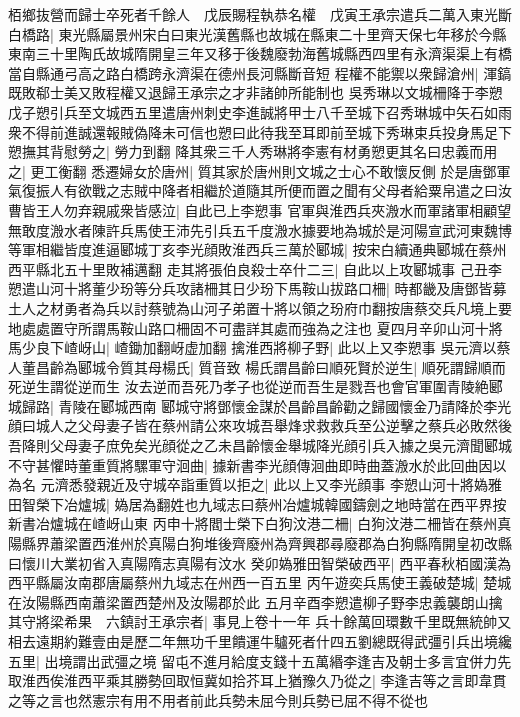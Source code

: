 栢鄉抜營而歸士卒死者千餘人　戊辰賜程執恭名權　戊寅王承宗遣兵二萬入東光斷白橋路|{
	東光縣屬景州宋白曰東光漢舊縣也故城在縣東二十里齊天保七年移於今縣東南三十里陶氏故城隋開皇三年又移于後魏廢勃海舊城縣西四里有永濟渠渠上有橋當自縣通弓高之路白橋跨永濟渠在德州長河縣斷音短}
程權不能禦以衆歸滄州|{
	渾鎬既敗郗士美又敗程權又退歸王承宗之才非諸帥所能制也}
吳秀琳以文城柵降于李愬戊子愬引兵至文城西五里遣唐州刺史李進誠將甲士八千至城下召秀琳城中矢石如雨衆不得前進誠還報賊偽降未可信也愬曰此待我至耳即前至城下秀琳束兵投身馬足下愬撫其背慰勞之|{
	勞力到翻}
降其衆三千人秀琳將李憲有材勇愬更其名曰忠義而用之|{
	更工衡翻}
悉遷婦女於唐州|{
	質其家於唐州則文城之士心不敢懷反側}
於是唐鄧軍氣復振人有欲戰之志賊中降者相繼於道隨其所便而置之聞有父母者給粟帛遣之曰汝曹皆王人勿弃親戚衆皆感泣|{
	自此已上李愬事}
官軍與淮西兵夾溵水而軍諸軍相顧望無敢度溵水者陳許兵馬使王沛先引兵五千度溵水據要地為城於是河陽宣武河東魏博等軍相繼皆度進逼郾城丁亥李光顔敗淮西兵三萬於郾城|{
	按宋白續通典郾城在蔡州西平縣北五十里敗補邁翻}
走其將張伯良殺士卒什二三|{
	自此以上攻郾城事}
己丑李愬遣山河十將董少玢等分兵攻諸柵其日少玢下馬鞍山拔路口柵|{
	時都畿及唐鄧皆募土人之材勇者為兵以討蔡號為山河子弟置十將以領之玢府巾翻按唐蔡交兵凡境上要地處處置守所謂馬鞍山路口柵固不可盡詳其處而強為之注也}
夏四月辛卯山河十將馬少良下嵖岈山|{
	嵖鋤加翻岈虚加翻}
擒淮西將柳子野|{
	此以上又李愬事}
吳元濟以蔡人董昌齡為郾城令質其母楊氏|{
	質音致}
楊氏謂昌齡曰順死賢於逆生|{
	順死謂歸順而死逆生謂從逆而生}
汝去逆而吾死乃孝子也從逆而吾生是戮吾也會官軍圍青陵絶郾城歸路|{
	青陵在郾城西南}
郾城守將鄧懷金謀於昌齡昌齡勸之歸國懷金乃請降於李光顔曰城人之父母妻子皆在蔡州請公來攻城吾舉烽求救救兵至公逆擊之蔡兵必敗然後吾降則父母妻子庶免矣光顔從之乙未昌齡懷金舉城降光顔引兵入據之吳元濟聞郾城不守甚懼時董重質將騾軍守洄曲|{
	據新書李光顔傳洄曲即時曲蓋溵水於此回曲因以為名}
元濟悉發親近及守城卒詣重質以拒之|{
	此以上又李光顔事}
李愬山河十將媯雅田智榮下冶爐城|{
	媯居為翻姓也九域志曰蔡州冶爐城韓國鑄劍之地時當在西平界按新書冶爐城在嵖岈山東}
丙申十將閻士榮下白狗汶港二柵|{
	白狗汶港二柵皆在蔡州真陽縣界蕭梁置西淮州於真陽白狗堆後齊廢州為齊興郡尋廢郡為白狗縣隋開皇初改縣曰懷川大業初省入真陽隋志真陽有汶水}
癸卯媯雅田智榮破西平|{
	西平春秋栢國漢為西平縣屬汝南郡唐屬蔡州九域志在州西一百五里}
丙午遊奕兵馬使王義破楚城|{
	楚城在汝陽縣西南蕭梁置西楚州及汝陽郡於此}
五月辛酉李愬遣柳子野李忠義襲朗山擒其守將梁希果　六鎮討王承宗者|{
	事見上卷十一年}
兵十餘萬回環數千里既無統帥又相去遠期約難壹由是歷二年無功千里饋運牛驢死者什四五劉總既得武彊引兵出境纔五里|{
	出境謂出武彊之境}
留屯不進月給度支錢十五萬緡李逢吉及朝士多言宜併力先取淮西俟淮西平乘其勝勢回取恒冀如拾芥耳上猶豫久乃從之|{
	李逢吉等之言即韋貫之等之言也然憲宗有用不用者前此兵勢未屈今則兵勢已屈不得不從也}

